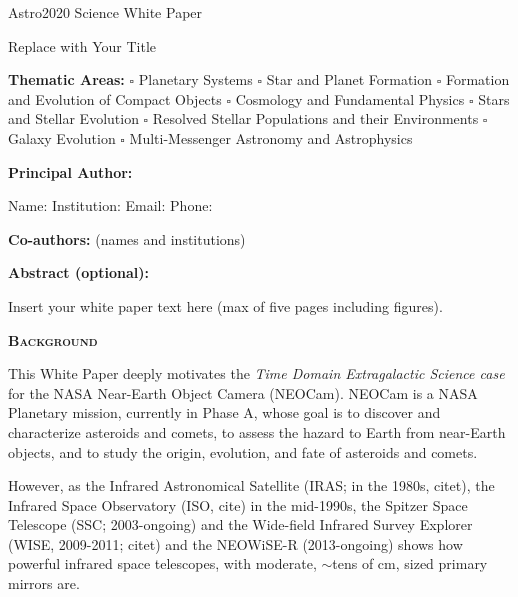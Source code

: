 \documentclass[12pt]{article}
\begin{document}
\raggedright
\huge
Astro2020 Science White Paper \linebreak

Replace with Your Title \linebreak
\normalsize

\noindent \textbf{Thematic Areas:} \hspace*{60pt} $\square$ Planetary Systems \hspace*{10pt} $\square$ Star and Planet Formation \hspace*{20pt}\linebreak
$\square$ Formation and Evolution of Compact Objects \hspace*{31pt} $\square$ Cosmology and Fundamental Physics \linebreak
  $\square$  Stars and Stellar Evolution \hspace*{1pt} $\square$ Resolved Stellar Populations and their Environments \hspace*{40pt} \linebreak
  $\square$    Galaxy Evolution   \hspace*{45pt} $\square$             Multi-Messenger Astronomy and Astrophysics \hspace*{65pt} \linebreak
  
\textbf{Principal Author:}

Name:	
 \linebreak						
Institution:  
 \linebreak
Email: 
 \linebreak
Phone:  
 \linebreak
 
\textbf{Co-authors:} (names and institutions)
  \linebreak

\textbf{Abstract  (optional):}


\pagebreak
Insert your white paper text here (max of five pages including figures).

{\bfseries \large \textsc{\textcolor{Cerulean}{Background}}}

This White Paper deeply motivates the {\it Time Domain Extragalactic Science case} for 
the NASA Near-Earth Object Camera (NEOCam). 
NEOCam is a NASA Planetary mission, currently in Phase A, whose goal is to discover and characterize asteroids and comets, to assess the hazard to Earth from near-Earth objects, and to study the origin, evolution, and fate of asteroids and comets.

\smallskip
\smallskip
\noindent
However, as the Infrared Astronomical Satellite (IRAS; in the 1980s, citet), 
the Infrared Space Observatory (ISO, cite) in the mid-1990s, the 
Spitzer Space Telescope (SSC; 2003-ongoing) and 
the Wide-field Infrared Survey Explorer (WISE, 2009-2011; citet) and 
the NEOWiSE-R (2013-ongoing) 
shows how powerful infrared space telescopes, with moderate, $\sim$tens of cm, sized 
primary mirrors are. 
\end{document}
